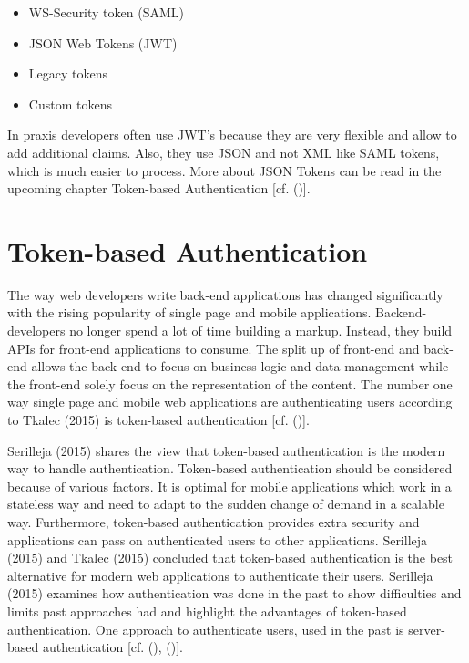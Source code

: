 \begin{itemize}
	\item WS-Security token (SAML)
	\item JSON Web Tokens (JWT)
	\item Legacy tokens
	\item Custom tokens
\end{itemize}

In praxis developers often use JWT's because they are very flexible and allow to add additional claims. Also, they use JSON and not XML like SAML tokens, which is much easier to process. More about JSON Tokens can be read in the upcoming chapter Token-based Authentication [cf. (\cite{Spencer:2018:APISecurity})].

\section{Token-based Authentication}
\label{tokenBasedAuthentication}

The way web developers write back-end applications has changed significantly with the rising popularity of single page and mobile applications. Backend-developers no longer spend a lot of time building a markup. Instead, they build APIs for front-end applications to consume. The split up of front-end and back-end allows the back-end to focus on business logic and data management while the front-end solely focus on the representation of the content. The number one way single page and mobile web applications are authenticating users according to Tkalec (2015) is token-based authentication [cf. (\cite{Tkalec:2015})].  

Serilleja (2015) shares the view that token-based authentication is the modern way to handle authentication. Token-based authentication should be considered because of various factors. It is optimal for mobile applications which work in a stateless way and need to adapt to the sudden change of demand in a scalable way. Furthermore, token-based authentication provides extra security and applications can pass on authenticated users to other applications. Serilleja (2015) and Tkalec (2015) concluded that token-based authentication is the best alternative for modern web applications to authenticate their users. Serilleja (2015) examines how authentication was done in the past to show difficulties and limits past approaches had and highlight the advantages of token-based authentication. One approach to authenticate users, used in the past is server-based authentication [cf. (\cite{Serilleja:2015:Scothio}), (\cite{Tkalec:2015})]. 

